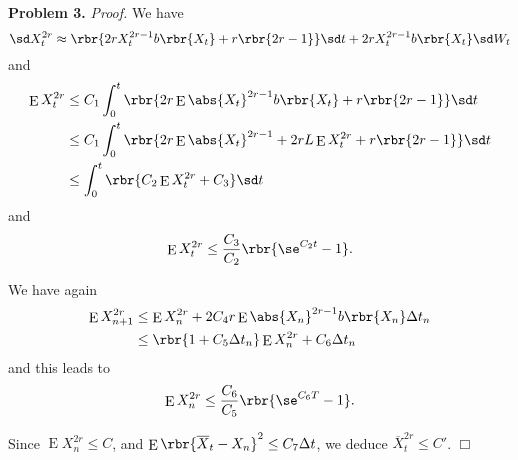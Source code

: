 \documentclass[english, nochinese]{pnote}
\DeclareMathOperator\ope{\mathrm{E}}
\begin{document}
\textbf{Problem 3.} \textit{Proof.} We have
\begin{equation}
\sd X_t^{ 2 r } \approx \rbr{ 2 r X_t^{ 2 r - 1 } b \rbr{X_t} + r \rbr{ 2 r - 1 } } \sd t + 2 r X_t^{ 2 r - 1 } b \rbr{X_t} \sd W_t
\end{equation}
and
\begin{equation}
\begin{split}
\ope X_t^{ 2 r } &\le C_1 \int_0^t \rbr{ 2 r \ope \abs{X_t}^{ 2 r - 1 } b \rbr{X_t} + r \rbr{ 2 r - 1 } } \sd t \\
&\le C_1 \int_0^t \rbr{ 2 r \ope \abs{X_t}^{ 2 r - 1 } + 2 r L \ope X_t^{ 2 r } + r \rbr{ 2 r - 1 } } \sd t \\
&\le \int_0^t \rbr{ C_2 \ope X_t^{ 2 r } + C_3 } \sd t \\
\end{split}
\end{equation}
and
\begin{equation}
\ope X_t^{ 2 r } \le \frac{C_3}{C_2} \rbr{ \se^{ C_2 t } - 1 }.
\end{equation}

We have again
\begin{equation}
\begin{split}
\ope X_{ n + 1 }^{ 2 r } &\le \ope X_n^{ 2 r } + 2 C_4 r \ope \abs{X_n}^{ 2 r - 1 } b \rbr{X_n} \Delta t_n \\
&\le \rbr{ 1 + C_5 \Delta t_n } \ope X_n^{ 2 r } + C_6 \Delta t_n
\end{split}
\end{equation}
and this leads to
\begin{equation}
\ope X_n^{ 2 r } \le \frac{C_6}{C_5} \rbr{ \se^{ C_6 T } - 1 }.
\end{equation}

Since $ \ope X_n^{ 2 r } \le C $, and $ \ope \rbr{ \overline{X}_t - X_n }^2 \le C_7 \Delta t $, we deduce $ \overline{X}_t^{ 2 r } \le C' $.
\hfill$\Box$
\end{document}
